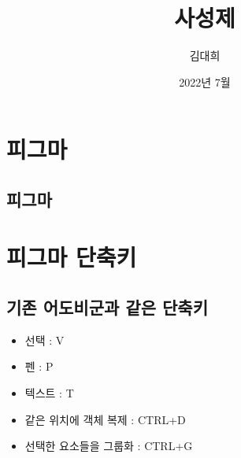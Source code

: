 \documentclass[12pt, a4paper, oneside]{book}
\begin{document}
	
			\dominitoc
			

			\title{사성제}
			\author{김대희}
			\date{2022년 7월}
			\maketitle


			\tableofcontents
			\listoffigures
			\listoftables

			

	\newpage
	\chapter{피그마}


		\newpage
		\minitoc				%


	\newpage  \null
	\section{피그마}



	\newpage
	\chapter{피그마 단축키 }


		\newpage
		\minitoc				%


	\newpage  \null


	\section{기존 어도비군과 같은 단축키}
			\begin{itemize}[topsep=0.0em, parsep=0.0em, itemsep=0em, leftmargin=6.0em, labelwidth=3em, labelsep=1em] 
			\item 	선택 : V
			\item 	펜 : P
			\item 	텍스트 : T
			\item 	같은 위치에 객체 복제 : CTRL+D
			\item 	선택한 요소들을 그룹화 :  CTRL+G
			\end{itemize}
\end{document}
